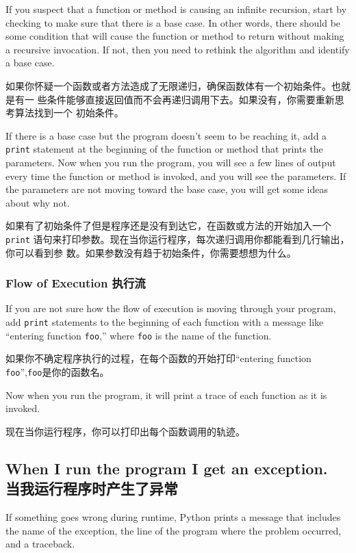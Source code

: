 \documentclass[10pt]{book}
\begin{document}
\begin{CJK}{UTF8}{gbsn}
If you suspect that a function or method is causing an infinite
recursion, start by checking to make sure that there is a base case.
In other words, there should be some condition that will cause the
function or method to return without making a recursive invocation.
If not, then you need to rethink the algorithm and identify a base
case.

如果你怀疑一个函数或者方法造成了无限递归，确保函数体有一个初始条件。也就是有一
些条件能够直接返回值而不会再递归调用下去。如果没有，你需要重新思考算法找到一个
初始条件。

If there is a base case but the program doesn't seem to be reaching
it, add a {\tt print} statement at the beginning of the function or method
that prints the parameters.  Now when you run the program, you will see
a few lines of output every time the function or method is invoked,
and you will see the parameters.  If the parameters are not moving
toward the base case, you will get some ideas about why not.

如果有了初始条件了但是程序还是没有到达它，在函数或方法的开始加入一个{\tt print}
语句来打印参数。现在当你运行程序，每次递归调用你都能看到几行输出，你可以看到参
数。如果参数没有趋于初始条件，你需要想想为什么。

\subsubsection{Flow of Execution 执行流}

If you are not sure how the flow of execution is moving through
your program, add {\tt print} statements to the beginning of each
function with a message like ``entering function {\tt foo},'' where
{\tt foo} is the name of the function.

如果你不确定程序执行的过程，在每个函数的开始打印``entering function {\tt
foo}'',{\tt foo}是你的函数名。

Now when you run the program, it will print a trace of each
function as it is invoked.

现在当你运行程序，你可以打印出每个函数调用的轨迹。

\subsection{When I run the program I get an exception.\\当我运行程序时产生了异常}

If something goes wrong during runtime, Python
prints a message that includes the name of the
exception, the line of the program where the problem occurred,
and a traceback.


\end{CJK}
\end{document}

